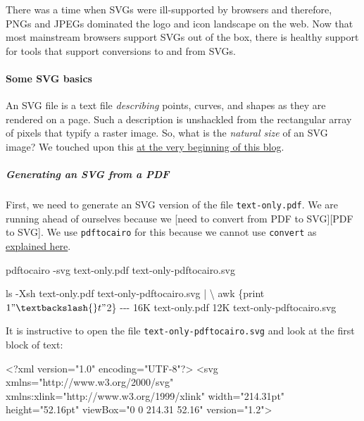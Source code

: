 \documentclass[
  11pt,
  british,
  a4paper,
]{article}
\newenvironment{Shaded}{\begin{snugshade}}{\end{snugshade}}
\newcommand{\AttributeTok}[1]{\textcolor[rgb]{0.80,0.80,0.80}{#1}}
\newcommand{\DataTypeTok}[1]{\textcolor[rgb]{0.87,0.87,0.75}{#1}}
\newcommand{\ExtensionTok}[1]{\textcolor[rgb]{0.80,0.80,0.80}{#1}}
\newcommand{\FunctionTok}[1]{\textcolor[rgb]{0.94,0.94,0.56}{#1}}
\newcommand{\KeywordTok}[1]{\textcolor[rgb]{0.94,0.87,0.69}{#1}}
\newcommand{\NormalTok}[1]{\textcolor[rgb]{0.80,0.80,0.80}{#1}}
\newcommand{\OtherTok}[1]{\textcolor[rgb]{0.94,0.94,0.56}{#1}}
\newcommand{\StringTok}[1]{\textcolor[rgb]{0.80,0.58,0.58}{#1}}
\begin{document}
There was a time when SVGs were ill-supported by browsers and therefore,
PNGs and JPEGs dominated the logo and icon landscape on the web. Now
that most mainstream browsers support SVGs out of the box, there is
healthy support for tools that support conversions to and from SVGs.

\hypertarget{some-svg-basics}{%
\paragraph{Some SVG basics}\label{some-svg-basics}}

An SVG file is a text file \emph{describing} points, curves, and shapes
as they are rendered on a page. Such a description is unshackled from
the rectangular array of pixels that typify a raster image. So, what is
the \emph{natural size} of an SVG image? We touched upon this
\protect\hyperlink{page-size-and-viewbox}{at the very beginning of this
blog}.

\hypertarget{generating-an-svg-from-a-pdf}{%
\subparagraph{Generating an SVG from a
PDF}\label{generating-an-svg-from-a-pdf}}

First, we need to generate an SVG version of the file
\texttt{text-only.pdf}. We are running ahead of ourselves because we
{[}need to convert from PDF to SVG{]}{[}PDF to SVG{]}. We use
\texttt{pdftocairo} for this because we cannot use \texttt{convert} as
\protect\hyperlink{why-is-imagemagick-disallowed-for-pdf-to-raster}{explained
here}.

\begin{Shaded}
\begin{Highlighting}[]
\ExtensionTok{pdftocairo} \AttributeTok{{-}svg}\NormalTok{ text{-}only.pdf text{-}only{-}pdftocairo.svg}

\FunctionTok{ls} \AttributeTok{{-}Xsh}\NormalTok{ text{-}only.pdf text{-}only{-}pdftocairo.svg }\KeywordTok{|} \DataTypeTok{\textbackslash{}}
\FunctionTok{awk} \StringTok{\textquotesingle{}\{print $1 "\textbackslash{}t" $2\}\textquotesingle{}}
\ExtensionTok{{-}{-}{-}}
\ExtensionTok{16K}\NormalTok{     text{-}only.pdf}
\ExtensionTok{12K}\NormalTok{     text{-}only{-}pdftocairo.svg}
\end{Highlighting}
\end{Shaded}

It is instructive to open the file \texttt{text-only-pdftocairo.svg} and
look at the first block of text:

\begin{Shaded}
\begin{Highlighting}[]
\KeywordTok{\textless{}?xml}\NormalTok{ version="1.0" encoding="UTF{-}8"}\KeywordTok{?\textgreater{}}
\KeywordTok{\textless{}svg}\OtherTok{ xmlns=}\StringTok{"http://www.w3.org/2000/svg"}\OtherTok{ xmlns:xlink=}\StringTok{"http://www.w3.org/1999/xlink"}\OtherTok{ width=}\StringTok{"214.31pt"}\OtherTok{ height=}\StringTok{"52.16pt"}\OtherTok{ viewBox=}\StringTok{"0 0 214.31 52.16"}\OtherTok{ version=}\StringTok{"1.2"}\KeywordTok{\textgreater{}}
\end{Highlighting}
\end{Shaded}
\end{document}
